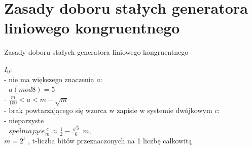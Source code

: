 \section{Zasady doboru stałych generatora liniowego kongruentnego}
	\begin{frame}{Zasady doboru stałych generatora liniowego kongruentnego}

 	 $I_{0}$: \\
 	 - nie ma większego znaczenia
	\newline \newline
	$a$: \\
	- $a(mod 8)=5$ \\
	- $\frac{m}{100}<a<m-\sqrt{m}$ \\
	- brak powtarzającego się wzorca w zapisie w systemie dwójkowym
	\newline \newline
	$c$: \\
	- nieparzyste \\
 	- $spełniające \frac{c}{m}\approx\frac{1}{2}-\frac{\sqrt{3}}{6}$
	\newline \newline
	$m$: \\
	$m=2^{t}$ , \quad t-liczba bitów przeznaczonych na 1 liczbę calkowitą


	\end{frame}
